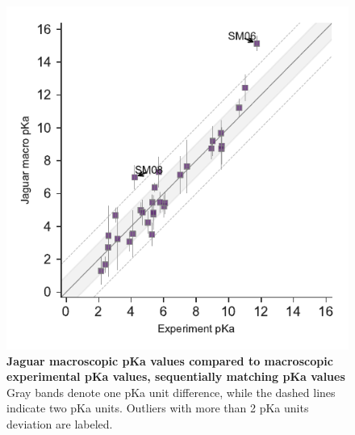 \documentclass[9pt,lineno,final]{elife}
\begin{document}
\begin{figure}[hbtp]
	\centering
	\includegraphics[]{Reports/Experiment-Jaguar-macro-align-correlation.pdf}	
	\caption{{\bf Jaguar macroscopic pKa values compared to macroscopic experimental pKa values, sequentially matching pKa values}  Gray bands denote one pKa unit difference, while the dashed lines indicate two pKa units. Outliers with more than 2 pKa units deviation are labeled.}
\end{figure}
\end{document}
